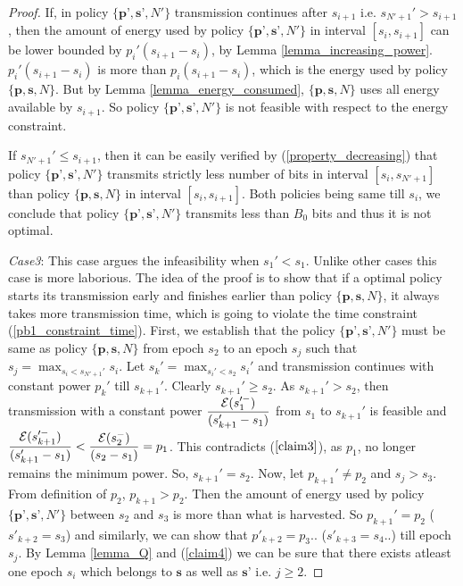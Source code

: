 \begin{proof}
If, in policy $\{\textbf{p'},\textbf{s'},N'\}$ transmission continues after $s_{i+1}$ i.e. $s_{N'+1}'>s_{i+1}$, then the amount of energy used by policy $\{ \textbf{p'},\textbf{s'},N'\}$ in interval $[s_{i},s_{i+1}]$ can be lower bounded by $p_i'(s_{i+1}-s_i)$, by Lemma \ref{lemma_increasing_power}. $p_i'(s_{i+1}-s_i)$ is more than $p_i(s_{i+1}-s_i)$, which is the energy used by policy $\{\textbf{p},\textbf{s},N\}$. But by Lemma \ref{lemma_energy_consumed}, $\{\textbf{p},\textbf{s},N\}$ uses all energy available by $s_{i+1}$. So policy $\{\textbf{p'},\textbf{s'},N'\}$ is not feasible with respect to the energy constraint. 

If $s_{N'+1}'\le s_{i+1}$, then it can be easily verified by (\ref{property_decreasing}) that policy $\{\textbf{p'},\textbf{s'},N'\}$ transmits strictly less number of bits in interval $[s_i,s_{N'+1}]$ than policy $\{\textbf{p},\textbf{s},N\}$ in interval $[s_{i},s_{i+1}]$. Both policies being same till $s_i$, we conclude that policy $\{\textbf{p'},\textbf{s'},N'\}$ transmits less than $B_0$  bits and thus it is not optimal.

\textit{Case3}: This case argues the infeasibility when $s_1'<s_1$. Unlike other cases this case is more laborious. The idea of the proof is to show that if a optimal policy starts its transmission early and finishes earlier than policy $\{\textbf{p},\textbf{s},N\}$, it always takes more transmission time, which is going to violate the time constraint (\ref{pb1_constraint_time}). First, we establish that the policy $\{\textbf{p'},\textbf{s'},N'\}$ must be same as policy $\{\textbf{p},\textbf{s},N\}$ from epoch $s_2$ to an epoch $s_j$ such that $s_j=\displaystyle\max_{s_i<s_{N'+1}'} s_i$. Let $s_k'=\displaystyle\max_{s_i'<s_2}s_i'$ and transmission continues with constant power $p_k'$ till $s_{k+1}'$. Clearly $s_{k+1}'\ge s_2$. As $s_{k+1}'>s_2$, then transmission with a constant power $\dfrac{\mathcal{E}(s_1'^-)}{(s_{k+1}'-s_1)} $ from $s_1$ to $s_{k+1}'$ is feasible and $\dfrac{\mathcal{E}(s_{k+1}'^-)}{(s_{k+1}'-s_1)}<\dfrac{\mathcal{E}(s_2^-)}{(s_2-s_1)}=p_1$. This contradicts ($\ref{claim3}$), as $p_1$, no longer remains the minimum power. So, $s_{k+1}'=s_2$. Now, let $p_{k+1}'\neq p_2$ and $s_j>s_3$. From definition of $p_2$, $p_{k+1}>p_2$. Then the amount of energy used by policy $\{\textbf{p'},\textbf{s'},N'\}$ between $s_2$ and $s_3$ is more than what is harvested. So $p_{k+1}'=p_2$ ($s'_{k+2}=s_3$) and similarly, we can show that $p'_{k+2}=p_3$.. ($ s'_{k+3}=s_4$..) till epoch $s_j$. By Lemma \ref{lemma_Q} and (\ref{claim4}) we can be sure that there exists atleast one epoch $s_i$ which belongs to $\textbf{s}$ as well as $\textbf{s'}$ i.e. $j\ge 2$.


\end{proof}
